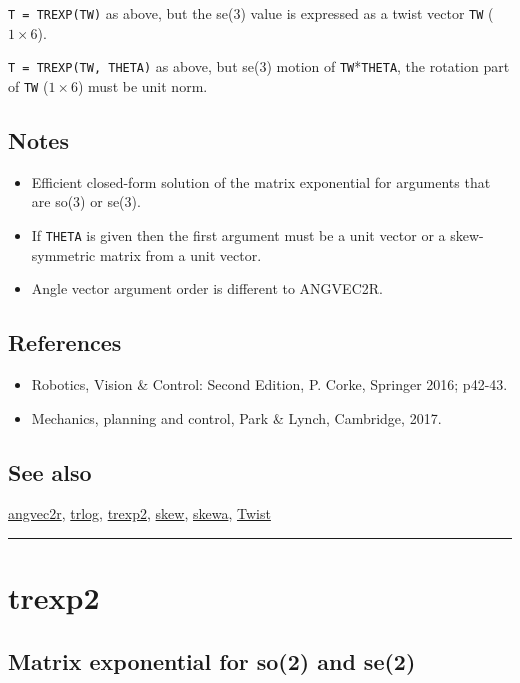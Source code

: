 \texttt{T = TREXP(TW)} as above, but the se(3) value is expressed as a twist vector \texttt{TW}
($1 \times 6$).



\texttt{T = TREXP(TW, THETA)} as above, but se(3) motion of \texttt{TW}*\texttt{THETA}, the
rotation part of \texttt{TW} ($1 \times 6$) must be unit norm.


\subsection*{Notes}
\begin{itemize}
  \item Efficient closed-form solution of the matrix exponential for arguments that are    so(3) or se(3).
  \item If \texttt{THETA} is given then the first argument must be a unit vector or a    skew-symmetric matrix from a unit vector.
  \item Angle vector argument order is different to ANGVEC2R.
\end{itemize}

\subsection*{References}
\begin{itemize}
  \item Robotics, Vision \& Control: Second Edition, P. Corke, Springer 2016; p42-43.
  \item Mechanics, planning and control, Park \& Lynch, Cambridge, 2017.
\end{itemize}

\subsection*{See also}


\hyperlink{angvec2r}{\color{blue} angvec2r}, \hyperlink{trlog}{\color{blue} trlog}, \hyperlink{trexp2}{\color{blue} trexp2}, \hyperlink{skew}{\color{blue} skew}, \hyperlink{skewa}{\color{blue} skewa}, \hyperlink{Twist}{\color{blue} Twist}

\vspace{1.5ex}\rule{\textwidth}{1mm}

\hypertarget{trexp2}{\section*{trexp2}}
\subsection*{Matrix exponential for so(2) and se(2)}

